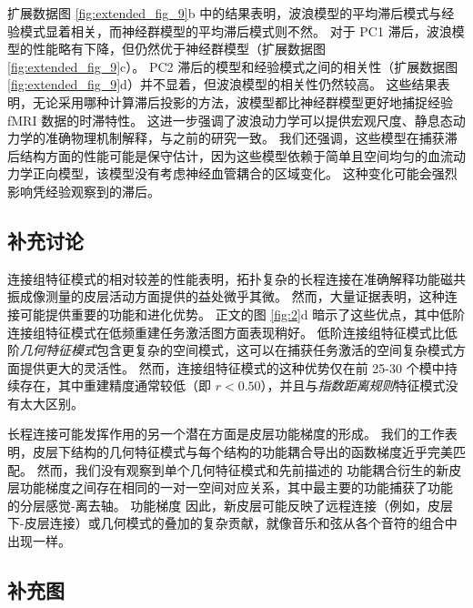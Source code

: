 \documentclass[lang=cn,a4paper,newtx,citestyle=gb7714-2015, bibstyle=gb7714-2015]{elegantpaper}
\begin{document}
扩展数据图 \ref{fig:extended_fig_9}b 中的结果表明，波浪模型的平均滞后模式与经验模式显着相关，而神经群模型的平均滞后模式则不然。
对于 PC1 滞后，波浪模型的性能略有下降，但仍然优于神经群模型（扩展数据图 \ref{fig:extended_fig_9}c）。
PC2 滞后的模型和经验模式之间的相关性（扩展数据图 \ref{fig:extended_fig_9}d）并不显着，但波浪模型的相关性仍然较高。
这些结果表明，无论采用哪种计算滞后投影的方法，波模型都比神经群模型更好地捕捉经验 fMRI 数据的时滞特性。
这进一步强调了波浪动力学可以提供宏观尺度、静息态动力学的准确物理机制解释，与之前的研究一致\cite{robinson2021determination,majeed2011spatiotemporal,matsui2016transient}。
我们还强调，这些模型在捕获滞后结构方面的性能可能是保守估计，因为这些模型依赖于简单且空间均匀的血流动力学正向模型，该模型没有考虑神经血管耦合的区域变化\cite{deco2021dynamical,henderson2022empirical,fischl2012freesurfer}。
这种变化可能会强烈影响凭经验观察到的滞后。


\subsection{补充讨论} \label{sec:supplementary_discussion}

连接组特征模式的相对较差的性能表明，拓扑复杂的长程连接在准确解释功能磁共振成像测量的皮层活动方面提供的益处微乎其微。
然而，大量证据表明，这种连接可能提供重要的功能和进化优势\cite{oldham2020efficacy,arslan2018human,tokariev2019large}。
正文的图 \ref{fig:2}d 暗示了这些优点，其中低阶连接组特征模式在低频重建任务激活图方面表现稍好。
低阶连接组特征模式比低阶\textit{几何特征模式}包含更复杂的空间模式，这可以在捕获任务激活的空间复杂模式方面提供更大的灵活性。
然而，连接组特征模式的这种优势仅在前 25-30 个模中持续存在，其中重建精度通常较低（即 $ r < 0.50 $），并且与\textit{指数距离规则}特征模式没有太大区别。


长程连接可能发挥作用的另一个潜在方面是皮层功能梯度的形成。
我们的工作表明，皮层下结构的几何特征模式与每个结构的功能耦合导出的函数梯度近乎完美匹配。
然而，我们没有观察到单个几何特征模式和先前描述的 功能耦合衍生的新皮层功能梯度之间存在相同的一对一空间对应关系，其中最主要的功能捕获了功能\cite{chen2022individuality} 的分层感觉-离去轴。
功能梯度 因此，新皮层可能反映了远程连接（例如，皮层下-皮层连接）或几何模式\cite{bolt2022parsimonious}的叠加的复杂贡献，就像音乐和弦从各个音符的组合中出现一样。



\subsection{补充图}
\end{document}
